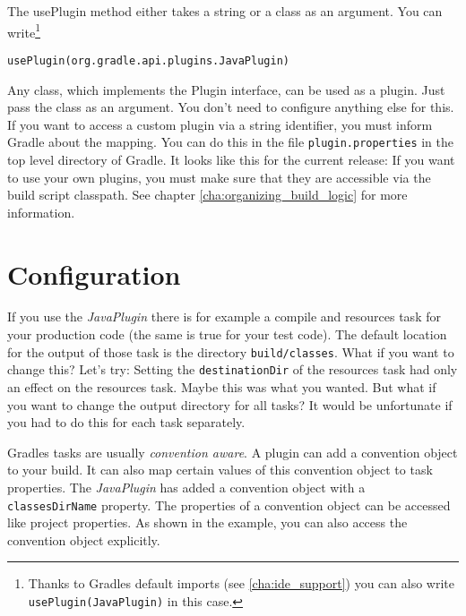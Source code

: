 \noindent The usePlugin method either takes a string or a class as an argument. You can write\footnote{Thanks to Gradles default imports (see \ref{cha:ide_support}) you can also write \texttt{usePlugin(JavaPlugin)} in this case.}
\begin{Verbatim}
usePlugin(org.gradle.api.plugins.JavaPlugin)
\end{Verbatim} 
Any class, which implements the Plugin interface, can be used as a plugin. Just pass the class as an argument. You don't need to configure anything else for this. If you want to access a custom plugin via a string identifier, you must inform Gradle about the mapping. You can do this in the file \texttt{plugin.properties} in the top level directory of Gradle. It looks like this for the current release:
If you want to use your own plugins, you must make sure that they are accessible via the build script classpath. See chapter \ref{cha:organizing_build_logic} for more information.

\section{Configuration} %
\label{sec:configuration}
If you use the \emph{JavaPlugin} there is for example a compile and resources task for your production code (the same is true for your test code). The default location for the output of those task is the directory \texttt{build/classes}. What if you want to change this? Let's try:
Setting the \texttt{destinationDir} of the resources task had only an effect on the resources task. Maybe this was what you wanted. But what if you want to change the output directory for all tasks? It would be unfortunate if you had to do this for each task separately. 

Gradles tasks are usually \emph{convention aware}. A plugin can add a convention object to your build. It can also map certain values of this convention object to task properties.
The \emph{JavaPlugin} has added a convention object with a \texttt{classesDirName} property. The properties of a convention object can be accessed like project properties. As shown in the example, you can also access the convention object explicitly.

